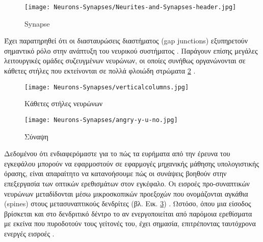 \documentclass[12pt]{report}
\begin{document}
\begin{figure}[htp]
    \centering
    \texttt{[image: Neurons-Synapses/Neurites-and-Synapses-header.jpg]}
    \caption{Synapse}
    \label{fig:synapse}
\end{figure}

Έχει παρατηρηθεί ότι οι διασταυρώσεις διαστήματος (\textlatin{gap junctions}) εξυπηρετούν σημαντικό ρόλο στην ανάπτυξη του νευρικού συστήματος \cite{Fischbach1972}. Παράγουν επίσης μεγάλες λειτουργικές ομάδες συζευγμένων νευρώνων, οι οποίες συνήθως οργανώνονται σε κάθετες στήλες που εκτείνονται σε πολλά φλοιώδη στρώματα \cite{Peinado1993} \cite{Yuste1992} \ref{fig:verticalcolumns} .

\begin{figure}[htp]
    \centering
    \texttt{[image: Neurons-Synapses/verticalcolumns.jpg]}
    \caption{Κάθετες στήλες νευρώνων \cite{molnar2020}}
    \label{fig:verticalcolumns}
\end{figure}
\begin{figure}[htp]
    \centering
    \texttt{[image: Neurons-Synapses/angry-y-u-no.jpg]}
    \caption{Σύναψη}
    \label{fig:spines}
\end{figure}

Δεδομένου ότι ενδιαφερόμαστε για το πώς τα ευρήματα από την έρευνα του εγκεφάλου μπορούν να εφαρμοστούν σε εφαρμογές μηχανικής μάθησης υπολογιστικής όρασης, είναι απαραίτητο να κατανοήσουμε πώς οι συνάψεις βοηθούν στην επεξεργασία των οπτικών ερεθισμάτων στον εγκέφαλο. Οι εισροές προ-συναπτικών νευρώνων μεταδίδονται μέσω μικροσκοπικών προεξοχών που ονομάζονται αγκάθια (\textlatin{spines}) στους μετασυναπτικούς δενδρίτες (βλ. Εικ. \ref{fig:spines}) \cite{tobias2017}. Ωστόσο, όπου μια είσοδος βρίσκεται και στο δενδριτικό δέντρο το αν ενεργοποιείται από παρόμοια ερεθίσματα με εκείνα που πυροδοτούν τους γείτονές του, έχει σημασία, επιτρέποντας ταυτόχρονα ενεργές εισροές \cite{London2005}.
\end{document}
